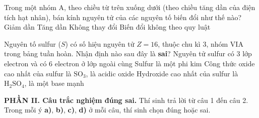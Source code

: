 \begin{ex}
    Trong một nhóm A, theo chiều từ trên xuống dưới (theo chiều tăng dần của điện tích hạt nhân), bán kính nguyên tử của các nguyên tố biến đổi như thế nào?
    \choice
    {Giảm dần}
    {\True Tăng dần}
    {Không thay đổi}
    {Biến đổi không theo quy luật}
\end{ex}

\begin{ex}
    Nguyên tố sulfur ($S$) có số hiệu nguyên tử $Z = 16$, thuộc chu kì 3, nhóm VIA trong bảng tuần hoàn. Nhận định nào sau đây là \textbf{sai}?
    \choice
    {Nguyên tử sulfur có 3 lớp electron và có 6 electron ở lớp ngoài cùng}
    {Sulfur là một phi kim}
    {Công thức oxide cao nhất của sulfur là $\text{SO}_3$, là acidic oxide}
    {\True Hydroxide cao nhất của sulfur là $\text{H}_2\text{SO}_4$, là một base mạnh}
\end{ex}

\noindent\textbf{\large PHẦN II. Câu trắc nghiệm đúng sai.} Thí sinh trả lời từ câu 1 đến câu 2. Trong mỗi ý \textbf{a)}, \textbf{b)}, \textbf{c)}, \textbf{d)} ở mỗi câu, thí sinh chọn đúng hoặc sai.

